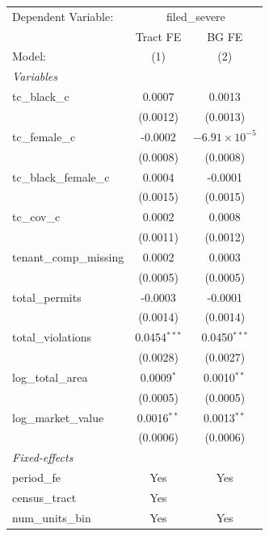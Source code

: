 \begin{tabular}{lcc}
   \tabularnewline \midrule \midrule
   Dependent Variable: & \multicolumn{2}{c}{filed\_severe}\\
                           & Tract FE       & BG FE \\   
   Model:                  & (1)            & (2)\\  
   \midrule
   \emph{Variables}\\
   tc\_black\_c            & 0.0007         & 0.0013\\   
                           & (0.0012)       & (0.0013)\\   
   tc\_female\_c           & -0.0002        & $-6.91\times 10^{-5}$\\    
                           & (0.0008)       & (0.0008)\\   
   tc\_black\_female\_c    & 0.0004         & -0.0001\\   
                           & (0.0015)       & (0.0015)\\   
   tc\_cov\_c              & 0.0002         & 0.0008\\   
                           & (0.0011)       & (0.0012)\\   
   tenant\_comp\_missing   & 0.0002         & 0.0003\\   
                           & (0.0005)       & (0.0005)\\   
   total\_permits          & -0.0003        & -0.0001\\   
                           & (0.0014)       & (0.0014)\\   
   total\_violations       & 0.0454$^{***}$ & 0.0450$^{***}$\\   
                           & (0.0028)       & (0.0027)\\   
   log\_total\_area        & 0.0009$^{*}$   & 0.0010$^{**}$\\   
                           & (0.0005)       & (0.0005)\\   
   log\_market\_value      & 0.0016$^{**}$  & 0.0013$^{**}$\\   
                           & (0.0006)       & (0.0006)\\   
   \midrule
   \emph{Fixed-effects}\\
   period\_fe              & Yes            & Yes\\  
   census\_tract           & Yes            & \\  
   num\_units\_bin         & Yes            & Yes\\  

\end{tabular}
